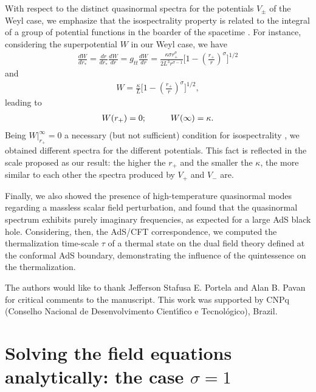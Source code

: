 \documentclass[preprint]{revtex4-1}
\def\be{\begin{eqnarray}}
\def\ee{\end{eqnarray}}
\begin{document}
With respect to the distinct quasinormal spectra for the potentials $V_\pm$ of the Weyl case, we emphasize that the isospectrality property is related to the integral of a group of potential functions in the boarder of the spacetime \cite{Chandrasekhar:1985kt}. For instance, considering the superpotential $W$ in our Weyl case, we have
\be
\label{cc1}
\frac{d W}{d r_*} = \frac{d r}{d r_*} \frac{d W}{d r} = g_{tt}\frac{d W}{d r}= \frac{\kappa \sigma r_+^\sigma}{2L^3 r^{\sigma -1}} \bigg[ 1- \left( \frac{r_+}{r} \right)^\sigma \bigg]^{1/2}
\ee
and
\be
\label{cc2}
W= \frac{\kappa}{L}\bigg[ 1- \left( \frac{r_+}{r} \right)^\sigma \bigg]^{1/2},
\ee
leading to 
\be
\label{cc3}
W(r_+)=0; \hspace{1.0cm} W(\infty ) = \kappa.
\ee
Being $W|_{r_+}^{\infty}=0$ a necessary (but not sufficient) condition for isospectrality \cite{Cardoso:2003pj}, we obtained different spectra for the different potentials. This fact is reflected in the scale proposed as our result: the higher the $r_+$ and the smaller the $\kappa$, the more similar to each other the spectra produced by $V_+$ and $V_-$ are.

Finally, we also showed the presence of high-temperature quasinormal modes regarding a massless scalar field perturbation, and found that the quasinormal spectrum exhibits purely imaginary frequencies, as expected for a large AdS black hole. Considering, then, the AdS/CFT correspondence, we computed the thermalization time-scale $\tau$ of a thermal state on the dual field theory defined at the conformal AdS boundary, demonstrating the influence of the quintessence on the thermalization.

\begin{acknowledgments}
The authors would like to thank Jefferson Stafusa E. Portela and Alan B. Pavan for critical comments to the manuscript. This work was supported by CNPq (Conselho Nacional de Desenvolvimento Cient\'{\i}fico e Tecnol\'ogico), Brazil.
\end{acknowledgments}


\appendix* \label{apendice}
\section{Solving the field equations analytically: the case $\sigma =1$}
\end{document}

